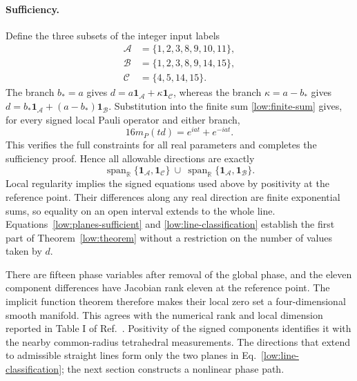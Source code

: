 \paragraph{Sufficiency.}
Define the three subsets of the integer input labels
\begin{align}
 \mathcal A&=\{1,2,3,8,9,10,11\},\nonumber\\
 \mathcal B&=\{1,2,3,8,9,14,15\},\nonumber\\
 \mathcal C&=\{4,5,14,15\}.
 \label{low:line-supports}
\end{align}
The branch $b_*=a$ gives $d=a\mathbf1_{\mathcal A}
+\kappa\mathbf1_{\mathcal C}$, whereas the branch
$\kappa=a-b_*$ gives $d=b_*\mathbf1_{\mathcal A}
+(a-b_*)\mathbf1_{\mathcal B}$.  Substitution into the finite sum
\eqref{low:finite-sum} gives, for every signed local Pauli operator and
either branch,
\begin{equation}
 16m_P(td)=e^{iat}+e^{-iat}.
 \label{low:planes-sufficient}
\end{equation}
This verifies the full constraints for all real parameters and completes the sufficiency proof.  Hence all allowable directions are exactly
\begin{equation}
 \operatorname{span}_{\mathbb R}
 \{\mathbf1_{\mathcal A},\mathbf1_{\mathcal C}\}
 \ \cup\ 
 \operatorname{span}_{\mathbb R}
 \{\mathbf1_{\mathcal A},\mathbf1_{\mathcal B}\}.
 \label{low:line-classification}
\end{equation}
Local regularity implies the signed equations used above by positivity at
the reference point.  Their differences along any real direction are finite
exponential sums, so equality on an open interval extends to the whole
line.  Equations~\eqref{low:planes-sufficient} and
\eqref{low:line-classification} establish the first part of
Theorem~\ref{low:theorem} without a restriction on the number of values
taken by $d$.

There are fifteen phase variables after removal of the global phase, and the eleven component differences have Jacobian rank eleven at the reference point. The implicit function theorem therefore makes their local zero set a four-dimensional smooth manifold. This agrees with the numerical rank and local dimension reported in Table I of Ref.~\cite{PauwelsGisin2026}. Positivity of the signed components identifies it with the nearby common-radius tetrahedral measurements. The directions that extend to admissible straight lines form only the two planes in Eq.~\eqref{low:line-classification}; the next section constructs a nonlinear phase path.

